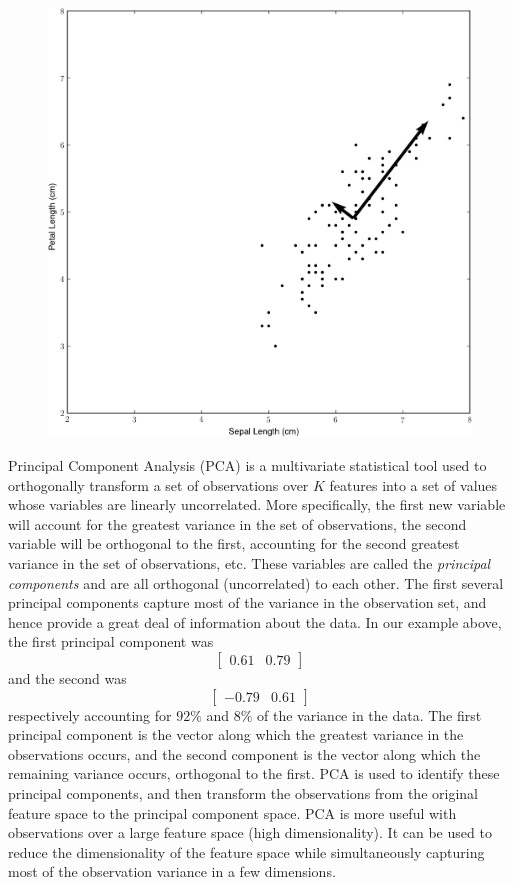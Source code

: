 \begin{figure}
\includegraphics[width=\textwidth]{iris2.pdf}
\end{figure}

Principal Component Analysis (PCA) is a multivariate statistical tool used to orthogonally transform a set of observations over $K$ features into a set of values whose variables are linearly uncorrelated. More specifically, the first new variable will account for the greatest variance in the set of observations, the second variable will be orthogonal to the first, accounting for the second greatest variance in the set of observations, etc. These variables are called the \emph{principal components} and are all orthogonal (uncorrelated) to each other. The first several principal components capture most of the variance in the observation set, and hence provide a great deal of information about the data.
In our example above, the first principal component was \[\left[ \begin{array}{cc} 0.61 & 0.79 \end{array} \right] \]  and the second was \[\left[ \begin{array}{cc} -0.79 & 0.61 \end{array} \right] \] respectively accounting for $92\%$ and $8\%$ of the variance in the data. The first principal component is the vector along which the greatest variance in the observations occurs, and the second component is the vector along which the remaining variance occurs, orthogonal to the first. PCA is used to identify these principal components, and then transform the observations from the original feature space to the principal component space.
PCA is more useful with observations over a large feature space (high dimensionality). It can be used to reduce the dimensionality of the feature space while simultaneously capturing most of the observation variance in a few dimensions.

